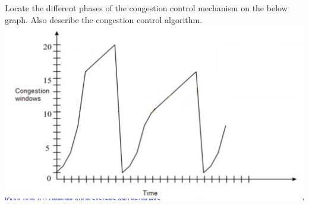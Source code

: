 \documentclass[../main.tex]{subfiles}
\begin{document}
\begin{wts}
    Locate the different phases of the congestion control mechanism on the below graph. Also describe the congestion control algorithm.\\
    \includegraphics[width=\textwidth]{subfiles/images/part3_q19_window_graphic.png}
\end{wts}
\end{document}
